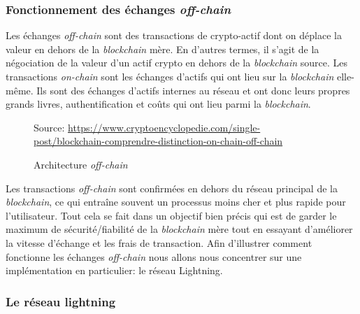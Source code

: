 \subsubsection{Fonctionnement des échanges \textit{off-chain}}
Les échanges \textit{off-chain} sont des transactions de crypto-actif dont on déplace la valeur en dehors de la \textit{blockchain} mère. En d’autres termes, il s’agit de la négociation de la valeur d’un actif crypto en dehors de la \textit{blockchain} source. Les transactions \textit{on-chain} sont les échanges d'actifs qui ont lieu sur la \textit{blockchain} elle-même.
Ils sont des échanges d’actifs internes au réseau et ont donc leurs propres grands livres, authentification et coûts qui ont lieu parmi la \textit{blockchain}.
\begin{figure}[h!]
    \centering
    {\scriptsize Source: \url{https://www.cryptoencyclopedie.com/single-post/blockchain-comprendre-distinction-on-chain-off-chain}}
    \caption{Architecture \textit{off-chain}}
    \label{fig:offchain}
\end{figure}
Les transactions \textit{off-chain} sont confirmées en dehors du réseau principal de la \textit{blockchain}, ce qui entraîne souvent un processus moins cher et plus rapide pour l’utilisateur. 
Tout cela se fait dans un objectif bien précis qui est de garder le maximum de sécurité/fiabilité de la \textit{blockchain} mère tout en essayant d'améliorer la vitesse d'échange et les frais de transaction.
Afin d'illustrer comment fonctionne les échanges \textit{off-chain} nous allons nous concentrer sur une implémentation en particulier: le réseau Lightning. 

\subsubsection{Le réseau lightning}

